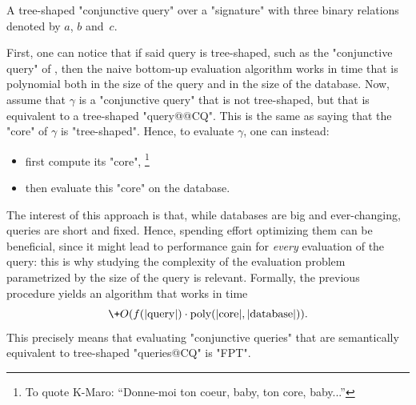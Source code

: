 \begin{marginfigure}
	\centering
	\caption{
		\AP\label{fig:intro-tree-shaped-CQ}
		A tree-shaped "conjunctive query" over a "signature"
		with three binary relations denoted by $a$, $b$ and~$c$.
	}
\end{marginfigure}
First, one can notice that if said query is tree-shaped,
such as the "conjunctive query" of , then the naive
bottom-up evaluation algorithm works in time that is polynomial both
in the size of the query and in the size of the database.
Now, assume that $\gamma$ is a "conjunctive query" that is not
tree-shaped, but that is equivalent to a tree-shaped "query@@CQ".
This is the same as saying that the "core" of $\gamma$ is "tree-shaped".
Hence, to evaluate $\gamma$, one can instead:
\begin{itemize}
	\item first compute its "core",%
	\footnote{To quote K-Maro: ``Donne-moi ton coeur, baby, ton core, baby...''}
	\item then evaluate this "core" on the database.
\end{itemize}
The interest of this approach is that, while databases are big and ever-changing,
queries are short and fixed. Hence, spending effort optimizing them can be beneficial,
since it might lead to performance gain
for \emph{every} evaluation of the query: this is why studying the
complexity of the evaluation problem parametrized by the size of
the query is relevant.
Formally, the previous procedure yields an algorithm that works in time
\[
	\+O(f(|\text{query}|) \cdot \text{poly}(|\text{core}|, |\text{database}|)).
\]
This precisely means that evaluating "conjunctive queries" that are semantically equivalent to
tree-shaped "queries@CQ" is "FPT".

